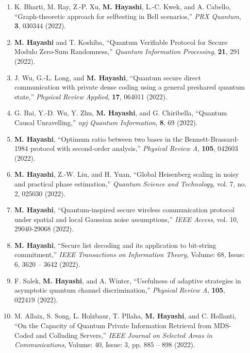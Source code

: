 \documentclass[a4paper,12pt,oneside]{article}
\begin{document}
\begin{enumerate}
\item
K. Bharti, M. Ray, Z.-P. Xu, \textbf{M. Hayashi}, L.-C. Kwek, and A. Cabello,
``Graph-theoretic approach for selftesting in Bell scenarios,”
{\em PRX Quantum},
{\bf 3}, 030344 (2022).

\item
\textbf{M. Hayashi} and T. Koshiba,
``Quantum Verifiable Protocol for Secure Modulo Zero-Sum Randomness,''
{\em Quantum Information Processing},
{\bf 21}, 291 (2022).

\item
J. Wu, G.-L. Long, and \textbf{M. Hayashi},
``Quantum secure direct communication with private dense coding using a general preshared quantum state,”
{\em Physical Review Applied},
{\bf 17}, 064011 (2022).

\item
G. Bai, Y.-D. Wu, Y. Zhu, \textbf{M. Hayashi}, and G. Chiribella,
``Quantum Causal Unravelling,”
{\em npj Quantum Information},
{\bf 8}, 69 (2022).

\item
\textbf{M. Hayashi},
``Optimum ratio between two bases in the Bennett-Brassard-1984 protocol with second-order analysis,''
{\em Physical Review A},
{\bf 105}, 042603 (2022).

\item
\textbf{M. Hayashi}, Z.-W. Liu, and H. Yuan,
``Global Heisenberg scaling in noisy and practical phase estimation,''
{\em Quantum Science and Technology},
vol. 7, no. 2, 025030 (2022).

\item
\textbf{M. Hayashi},
``Quantum-inspired secure wireless communication protocol under spatial and local Gaussian noise assumptions,''
{\em IEEE Access},
vol. 10, 29040-29068 (2022).

\item
\textbf{M. Hayashi},
``Secure list decoding and its application to bit-string commitment,''
{\em IEEE Transactions on Information Theory},
Volume: 68, Issue: 6, 3620 – 3642 (2022).

\item
F. Salek, \textbf{M. Hayashi}, and A. Winter,
``Usefulness of adaptive strategies in asymptotic quantum channel discrimination,''
{\em Physical Review A},
{\bf 105}, 022419 (2022).

\item
M. Allaix, S. Song, L. Holzbaur, T. Pllaha, \textbf{M. Hayashi}, and C. Hollanti,
``On the Capacity of Quantum Private Information Retrieval from MDS-Coded and Colluding Servers,''
{\em IEEE Journal on Selected Areas in Communications},
Volume: 40, Issue: 3, pp. 885 – 898 (2022).


\end{enumerate}
\end{document}
